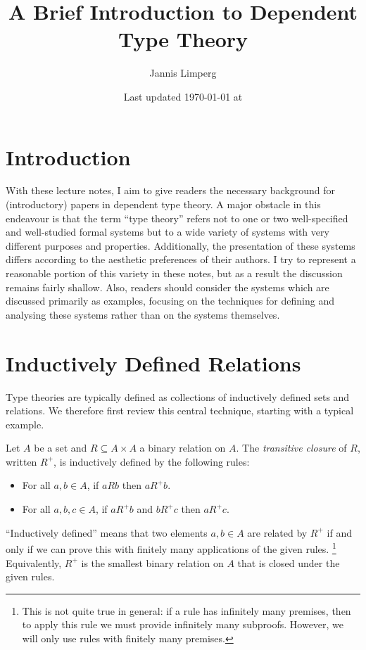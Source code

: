 \documentclass{article}
\theoremstyle{definition}
\begin{document}
\title{A Brief Introduction to Dependent Type Theory}
\author{Jannis Limperg}
\date{Last updated \today{} at \currenttime}
\maketitle

\section{Introduction}

With these lecture notes, I aim to give readers the necessary background for (introductory) papers in dependent type theory.
A major obstacle in this endeavour is that the term \enquote{type theory} refers not to one or two well-specified and well-studied formal systems but to a wide variety of systems with very different purposes and properties.
Additionally, the presentation of these systems differs according to the aesthetic preferences of their authors.
I try to represent a reasonable portion of this variety in these notes, but as a result the discussion remains fairly shallow.
Also, readers should consider the systems which are discussed primarily as examples, focusing on the techniques for defining and analysing these systems rather than on the systems themselves.

\section{Inductively Defined Relations}%
\label{sec:indrel}

Type theories are typically defined as collections of inductively defined sets and relations.
We therefore first review this central technique, starting with a typical example.

\begin{definition}
  Let $A$ be a set and $R ⊆ A × A$ a binary relation on $A$.
  The \emph{transitive closure} of $R$, written $R^{+}$, is inductively defined by the following rules:
  \begin{itemize}
    \item For all $a,b ∈ A$, if $aRb$ then $aR^{+}b$.
    \item For all $a,b,c ∈ A$, if $aR^{+}b$ and $bR^{+}c$ then $aR^{+}c$.
  \end{itemize}
\end{definition}

\enquote{Inductively defined} means that two elements $a,b ∈ A$ are related by $R^{+}$ if and only if we can prove this with finitely many applications of the given rules.%
\footnote{This is not quite true in general: if a rule has infinitely many premises, then to apply this rule we must provide infinitely many subproofs.
  However, we will only use rules with finitely many premises.}
Equivalently, $R^{+}$ is the smallest binary relation on $A$ that is closed under the given rules.
\end{document}
